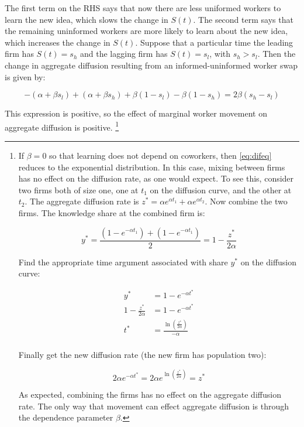 \documentclass[]{article}
\begin{document}
The first term on the RHS says that now there are less uniformed workers to learn the new idea, which slows the change in $S(t)$.  The second term says that the remaining uninformed workers are more likely to learn about the new idea, which increases the change in $S(t)$.  Suppose that a particular time the leading firm has $S(t) = s_h$ and the lagging firm has $S(t) = s_l$, with $s_h > s_l$.  Then the change in aggregate diffusion resulting from an informed-uninformed worker swap is given by:

\begin{equation}
- \left( \alpha + \beta s_l \right) + \left( \alpha + \beta s_h \right) + \beta \left(1 - s_l\right) - \beta \left(1 - s_h\right) = 2 \beta (s_h - s_l)
\end{equation}

This expression is positive, so the effect of marginal worker movement on aggregate diffusion is positive.  \footnote{If $\beta = 0$ so that learning does not depend on coworkers, then \eqref{eq:difeq} reduces to the exponential distribution. In this case, mixing between firms has no effect on the diffusion rate, as one would expect.  To see this, consider two firms both of size one, one at $t_1$ on the diffusion curve, and the other at $t_2$.  The aggregate diffusion rate is $z^* = \alpha e^{\alpha t_1} + \alpha e^{\alpha t_2}$.  Now combine the two firms.  The knowledge share at the combined firm is:

\begin{equation} 
    y^* = \frac{(1 - e^{-\alpha t_1}) + (1 - e^{-\alpha t_1})}{2} = 1 - \frac{z^*}{2\alpha} \nonumber
\end{equation}

Find the appropriate time argument associated with share $y^*$ on the diffusion curve:

\begin{align*}
    y^* &= 1 - e^{-\alpha t^*} \\
    1 - \frac{z^*}{2\alpha} &= 1 - e^{-\alpha t^*} \\
    t^* &= \frac{\ln (\frac{z^*}{2 \alpha})}{-\alpha} \\
\end{align*}

Finally get the new diffusion rate (the new firm has population two):

\begin{equation}
    2 \alpha e^{- \alpha t^*} = 2 \alpha e^{\ln (\frac{z^*}{2 \alpha})} = z^* \nonumber
\end{equation}

As expected, combining the firms has no effect on the aggregate diffusion rate.  The only way that movement can effect aggregate diffusion is through the dependence parameter $\beta$.}
\end{document}

